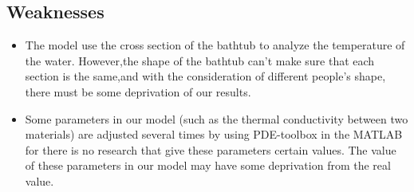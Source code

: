 \documentclass{HZNUMCM}
\begin{document}
\subsection{Weaknesses}
\begin{itemize}
    \item The model use the cross section of the bathtub to analyze the temperature of the water.
    However,the shape of the bathtub can't make sure that each section is the same,and with the
    consideration of different people's shape, there must be some deprivation of our results.
    \item Some parameters in our model (such as the thermal conductivity between two materials) are
    adjusted several times by using PDE-toolbox in the MATLAB for there is no research that give
    these parameters certain values. The value of these parameters in our model may have some
    deprivation from the real value.
\end{itemize}
\end{document}
